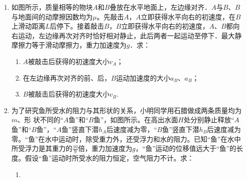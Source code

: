 \begin{enumerate}[leftmargin=0em]
\newpage

\item 
{}
如图所示，质量相等的物块$ A $和$ B $叠放在水平地面上，左边缘对齐．$ A $与$ B $、$ B $与地面间的动摩擦因数均为$ \mu $。先敲击$ A $，$ A $立即获得水平向右的初速度，在$ B $上滑动距离$ L $后停下。接着敲击$ B $，$ B $立即获得水平向右的初速度，$ A $、$ B $都向右运动，左边缘再次对齐时恰好相对静止，此后两者一起运动至停下．最大静摩擦力等于滑动摩擦力，重力加速度为$ g $．求：
\begin{enumerate}
\renewcommand{\labelenumi}{\arabic{enumi}.}
\item
$ A $被敲击后获得的初速度大小$ v_A $；
\item 
在左边缘再次对齐的前、后，$ B $运动加速度的大小$ a_B $、$ a_B $；
\item 
$ B $被敲击后获得的初速度大小$ v_B $.
\end{enumerate}
\begin{figure}[h!]
\flushright

\end{figure}






\item 
{}
为了研究鱼所受水的阻力与其形状的关系，小明同学用石腊做成两条质量均为$ m $、形
状不同的“$ A $鱼”和“$ B $鱼”，如图所示。在高出水面$ H $处分别静止释放“$ A $鱼”和“$ B $鱼”，“$ A $鱼”竖直下潜$ h_A $后速度减为零，“$ B $鱼”竖直下潜$ h_B $后速度减为零。“鱼”在水中运动时，除受重力外，还受浮力和水的阻力。已知“鱼”在水中所受浮力是其重力的$ \frac{10}{9} $倍，重力加速度为$ g $，“鱼”运动的位移值远大于“鱼”的长度。假设“鱼”运动时所受水的阻力恒定，空气阻力不计。求：
\begin{enumerate}
\renewcommand{\labelenumii}{(\arabic{enumii})}
\item 


\end{enumerate}
\end{enumerate}
